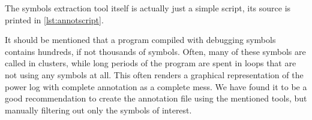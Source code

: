 The symbols extraction tool itself is actually just a simple script, its source is printed
in \autoref{lst:annotscript}.



It should be mentioned that a program compiled with debugging symbols contains
hundreds, if not thousands of symbols. Often, many of these symbols are called
in clusters, while long periods of the program are spent in loops that are not
using any symbols at all. This often renders a graphical representation of the
power log with complete annotation as a complete mess. We have found it to be a
good recommendation to create the annotation file using the mentioned tools, but
manually filtering out only the symbols of interest.





